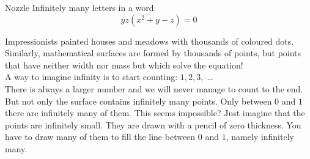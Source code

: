 \begin{surferPage}{Nozzle}
Infinitely many letters in a word\\
\smallskip
\[y z (x^2	+ y - z)	= 0\]

\vspace{0.3cm}
Impressionists painted houses and meadows with thousands of coloured dots. Similarly, mathematical surfaces are formed by thousands of points, but points that have neither width nor mass but which solve the equation! \\
\vspace{0.3cm}
A way to imagine infinity is to start counting: $1, 2, 3,$ \dots\\
There is always a larger number and we will never manage to count to the end.\\
\vspace{0.3cm}
But not only the surface contains infinitely many points. Only between $0$ and $1$ there are infinitely many of them. This seems impossible? Just imagine that the points are infinitely small. They are drawn with a pencil of zero thickness. You have to draw many of them to fill the line between $0$ and $1$, namely infinitely many.
\end{surferPage}
